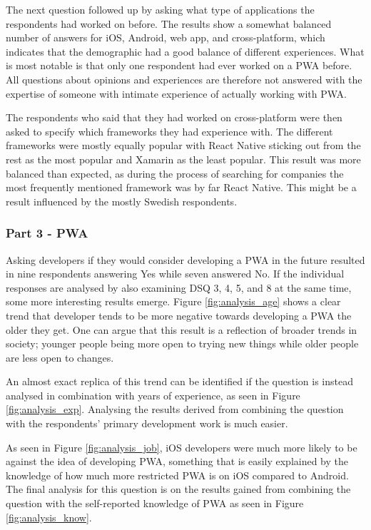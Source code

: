 \documentclass[a4paper,12pt]{article}
\begin{document}
The next question followed up by asking what type of applications the respondents had worked on before. The results show a somewhat balanced number of answers for iOS, Android, web app, and cross-platform, which indicates that the demographic had a good balance of different experiences. What is most notable is that only one respondent had ever worked on a PWA before. All questions about opinions and experiences are therefore not answered with the expertise of someone with intimate experience of actually working with PWA.

The respondents who said that they had worked on cross-platform were then asked to specify which frameworks they had experience with. The different frameworks were mostly equally popular with React Native sticking out from the rest as the most popular and Xamarin as the least popular. This result was more balanced than expected, as during the process of searching for companies the most frequently mentioned framework was by far React Native. This might be a result influenced by the mostly Swedish respondents.

\subsubsection{Part 3 - PWA}
\label{Analysis_devSurvey_part3}
Asking developers if they would consider developing a PWA in the future resulted in nine respondents answering Yes while seven answered No. If the individual responses are analysed by also examining DSQ 3, 4, 5, and 8 at the same time, some more interesting results emerge.  Figure \ref{fig:analysis_age} shows a clear trend that developer tends to be more negative towards developing a PWA the older they get. One can argue that this result is a reflection of broader trends in society; younger people being more open to trying new things while older people are less open to changes.

An almost exact replica of this trend can be identified if the question is instead analysed in combination with years of experience, as seen in Figure \ref{fig:analysis_exp}. Analysing the results derived from combining the question with the respondents' primary development work is much easier.

As seen in Figure \ref{fig:analysis_job}, iOS developers were much more likely to be against the idea of developing PWA, something that is easily explained by the knowledge of how much more restricted PWA is on iOS compared to Android. The final analysis for this question is on the results gained from combining the question with the self-reported knowledge of PWA as seen in Figure \ref{fig:analysis_know}.
\end{document}
